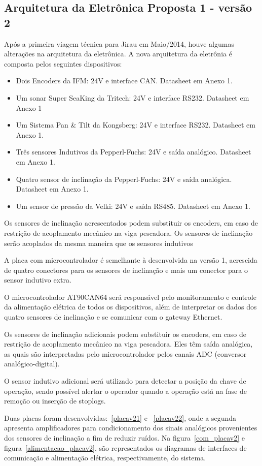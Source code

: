 \subsection{Arquitetura da Eletrônica Proposta 1 - versão 2}
Após a primeira viagem técnica para Jirau em Maio/2014, houve algumas alterações
na arquitetura da eletrônica. 
A nova arquitetura da eletrônia é composta pelos seguintes dispositivos:
\begin{itemize}
  \item Dois Encoders da IFM: 24V e interface CAN. Datasheet em Anexo 1.
  \item Um sonar Super SeaKing da Tritech: 24V e interface RS232. Data\-sheet em
  Anexo 1
  \item Um Sistema Pan \& Tilt da Kongsberg: 24V e interface RS232. Data\-sheet
  em Anexo 1.
  \item Três sensores Indutivos da Pepperl-Fuchs: 24V e saída ana\-lógico.
  Data\-sheet em Anexo 1.
  \item Quatro sensor de inclinação da Pepperl-Fuchs: 24V e saída analógica.
  Data\-sheet em Anexo 1.
  \item Um sensor de pressão da Velki: 24V e saída RS485. Datasheet em Anexo 1.
\end{itemize}
Os sensores de inclinação acrescentados podem substituir os encoders, em caso de
restrição de acoplamento mecânico na viga pescadora. 
Os sensores de inclinação serão acoplados da mesma
maneira que os sensores indutivos

A placa com microcontrolador é semelhante à desenvolvida na versão 1,
acrescida de quatro conectores para os sensores de inclinação e mais um
conector para o sensor indutivo extra. 

O microcontrolador AT90CAN64 será responsável pelo monitoramento e controle da
alimentação elétrica de todos os dispositivos, além de interpretar os dados dos
quatro sensores de inclinação e se comunicar com o gateway Ethernet. 

Os sensores de inclinação adicionais podem substituir os encoders, em caso de
restrição de acoplamento mecânico na viga pescadora. Eles têm saída
analógica, as quais são interpretadas pelo microcontrolador pelos canais
ADC (conversor analógico-digital).

O sensor indutivo adicional será utilizado para detectar a posição da chave de
operação, sendo possível alertar o operador quando a operação está na fase de
remoção ou inserção de stoplogs.

Duas placas foram desenvolvidas:~\ref{placav21} e ~\ref{placav22}, onde a segunda apresenta
amplificadores para condicionamento dos sinais analógicos provenientes dos
sensores de inclinação a fim de reduzir ruídos. Na figura~\ref{com_placav2} e
figura~\ref{alimentacao_placav2}, são representados os diagramas de interfaces de comunicação e alimentação elétrica,
respectivamente, do sistema.

